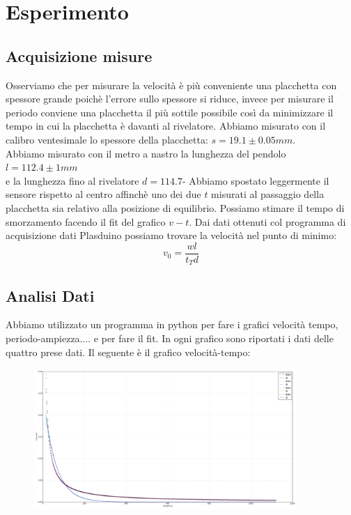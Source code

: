\documentclass[a4paper,10pt]{article}
\begin{document}
\section{Esperimento}
\subsection{Acquisizione misure}
Osserviamo che per misurare la velocità è più conveniente una placchetta con spessore grande poichè l'errore sullo spessore si riduce, invece per misurare il periodo conviene una placchetta
il più sottile possibile così da minimizzare il tempo in cui la placchetta è davanti al rivelatore.
Abbiamo misurato con il calibro ventesimale lo spessore della placchetta: $s=19.1\pm 0.05mm$.\\
Abbiamo misurato con il metro a nastro la lunghezza del pendolo $l=112.4\pm1mm$\\ e la lunghezza fino al rivelatore $d=114.7$-
Abbiamo spostato leggermente il sensore rispetto al centro affinchè uno dei due $t$ misurati al passaggio della placchetta sia relativo alla posizione di equilibrio.
Possiamo stimare il tempo di smorzamento facendo il fit del grafico $v-t$.
Dai dati ottenuti col programma di acquisizione dati Plasduino possiamo trovare la velocità nel punto di minimo:
\begin{equation}
 v_0=\frac{wl}{t_Td}
\end{equation}



\subsection{Analisi Dati}
Abbiamo utilizzato un programma in python per fare i grafici velocità tempo, periodo-ampiezza.... e per fare il fit.
In ogni grafico sono riportati i dati delle quattro prese dati.
Il seguente è il grafico velocità-tempo:

\begin{figure}[!htb]
\begin{center}
\includegraphics[width=10cm]{dati/pendolo4.png}
\end{center}
\end{figure}
\end{document}
